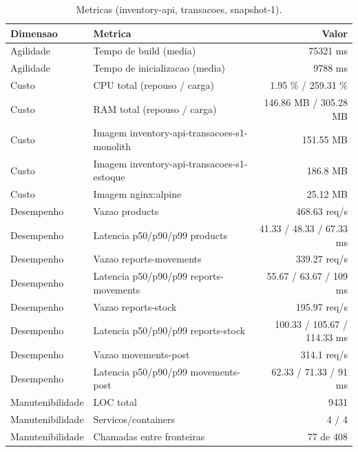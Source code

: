 \begin{table}[htb]
  \centering
  \caption{Metricas (inventory-api, transacoes, snapshot-1).}
  \label{tab:metricas-inventory-api-transacoes-snapshot-1}
  \begin{tabular}{llr}
    \hline
    \textbf{Dimensao} & \textbf{Metrica} & \textbf{Valor} \\
    \hline
    Agilidade & Tempo de build (media) & 75321 ms \\
    Agilidade & Tempo de inicializacao (media) & 9788 ms \\
    Custo & CPU total (repouso / carga) & 1.95 \% / 259.31 \% \\
    Custo & RAM total (repouso / carga) & 146.86 MB / 305.28 MB \\
    Custo & Imagem inventory-api-transacoes-s1-monolith & 151.55 MB \\
    Custo & Imagem inventory-api-transacoes-s1-estoque & 186.8 MB \\
    Custo & Imagem nginx:alpine & 25.12 MB \\
    Desempenho & Vazao products & 468.63 req/s \\
    Desempenho & Latencia p50/p90/p99 products & 41.33 / 48.33 / 67.33 ms \\
    Desempenho & Vazao reports-movements & 339.27 req/s \\
    Desempenho & Latencia p50/p90/p99 reports-movements & 55.67 / 63.67 / 109 ms \\
    Desempenho & Vazao reports-stock & 195.97 req/s \\
    Desempenho & Latencia p50/p90/p99 reports-stock & 100.33 / 105.67 / 114.33 ms \\
    Desempenho & Vazao movements-post & 314.1 req/s \\
    Desempenho & Latencia p50/p90/p99 movements-post & 62.33 / 71.33 / 91 ms \\
    Manutenibilidade & LOC total & 9431 \\
    Manutenibilidade & Servicos/containers & 4 / 4 \\
    Manutenibilidade & Chamadas entre fronteiras & 77 de 408 \\
    \hline
  \end{tabular}
\end{table}
